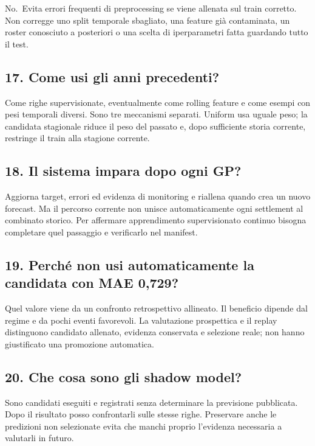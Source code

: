\documentclass[11pt,a4paper]{article}
\begin{document}
No.~Evita errori frequenti di preprocessing se viene allenata sul train corretto. Non corregge uno split temporale sbagliato, una feature già contaminata, un roster conosciuto a posteriori o una scelta di iperparametri fatta guardando tutto il test.

\subsection{17. Come usi gli anni precedenti?}\label{come-usi-gli-anni-precedenti}

Come righe supervisionate, eventualmente come rolling feature e come esempi con pesi temporali diversi. Sono tre meccanismi separati. Uniform usa uguale peso; la candidata stagionale riduce il peso del passato e, dopo sufficiente storia corrente, restringe il train alla stagione corrente.

\subsection{18. Il sistema impara dopo ogni GP?}\label{il-sistema-impara-dopo-ogni-gp}

Aggiorna target, errori ed evidenza di monitoring e riallena quando crea un nuovo forecast. Ma il percorso corrente non unisce automaticamente ogni settlement al combinato storico. Per affermare apprendimento supervisionato continuo bisogna completare quel passaggio e verificarlo nel manifest.

\subsection{19. Perché non usi automaticamente la candidata con MAE 0,729?}\label{perchuxe9-non-usi-automaticamente-la-candidata-con-mae-0729}

Quel valore viene da un confronto retrospettivo allineato. Il beneficio dipende dal regime e da pochi eventi favorevoli. La valutazione prospettica e il replay distinguono candidato allenato, evidenza conservata e selezione reale; non hanno giustificato una promozione automatica.

\subsection{20. Che cosa sono gli shadow model?}\label{che-cosa-sono-gli-shadow-model}

Sono candidati eseguiti e registrati senza determinare la previsione pubblicata. Dopo il risultato posso confrontarli sulle stesse righe. Preservare anche le predizioni non selezionate evita che manchi proprio l'evidenza necessaria a valutarli in futuro.
\end{document}
